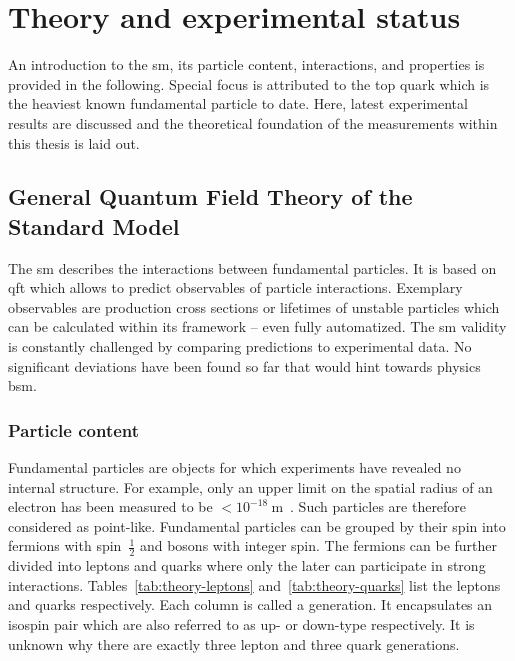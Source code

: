 \chapter{Theory and experimental status}

An introduction to the \gls{sm}, its particle content, interactions, and properties is provided in the following. Special focus is attributed to the top quark which is the heaviest known fundamental particle to date. Here, latest experimental results are discussed and the theoretical foundation of the measurements within this thesis is laid out.


\section{General Quantum Field Theory of the Standard Model}

The \gls{sm} describes the interactions between fundamental particles. It is based on \gls{qft} which allows to predict observables of particle interactions. Exemplary observables are production cross sections or lifetimes of unstable particles which can be calculated within its framework -- even fully automatized. The \gls{sm} validity is constantly challenged by comparing predictions to experimental data. No significant deviations have been found so far that would hint towards physics \gls{bsm}.


\subsection{Particle content}

Fundamental particles are objects for which experiments have revealed no internal structure. For example, only an upper limit on the spatial radius of an electron has been measured to be $<10^{-18}~\mathrm{m}$~\cite{PhysRevLett.97.030801}. Such particles are therefore considered as point-like. Fundamental particles can be grouped by their spin into fermions with spin~$\frac{1}{2}$ and bosons with integer spin. The fermions can be further divided into leptons and quarks where only the later can participate in strong interactions. Tables~\ref{tab:theory-leptons} and~\ref{tab:theory-quarks} list the leptons and quarks respectively. Each column is called a generation. It encapsulates an isospin pair which are also referred to as up- or down-type respectively. It is unknown why there are exactly three lepton and three quark generations.

